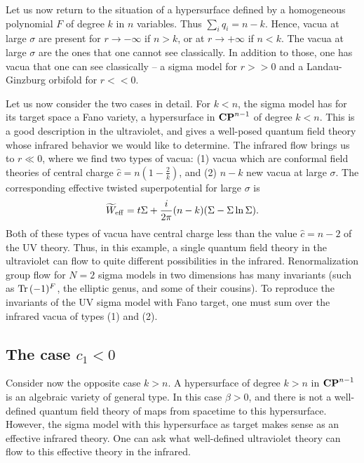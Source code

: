 Let us now return to the situation of a hypersurface defined by a
homogeneous polynomial $F$ of degree $k$ in $n$ variables.
Thus $\sum_iq_i=n-k$.  Hence, vacua at large $\sigma$ are present
for $r\to-\infty$ if $n>k$, or at $r\to +\infty$ if $n<k$.
The vacua at large $\sigma$ are the ones that one cannot see classically.
In addition to those, one has vacua that one can see classically
-- a sigma model for $r>>0$ and a Landau-Ginzburg orbifold for $r<<0$.

\centerline{\quad}
\centerline{\epsfysize=1.35in}
\centerline{\quad}

Let us now consider the two cases in detail.  For $k<n$, the sigma
model has for its target space a Fano variety, a hypersurface in
${\bf CP}^{n-1}$ of degree $k<n$.   This is a good description in the
ultraviolet, and gives a well-posed quantum field theory whose
infrared behavior we would like to determine.
The infrared flow brings us to $r\ll0$, where we find two types of
vacua:
(1) vacua which are conformal field theories of central charge
$\widehat{c}=n(1-\frac2k)$, and
(2) $n-k$ new vacua at large $\sigma$.  The corresponding effective twisted
superpotential for large $\sigma$ is
$$\widetilde{W}_{\rm eff}=t\Sigma + \frac{i}{2\pi}(n-k)(\Sigma -
\Sigma\ln\Sigma).$$
Both of these types of vacua
 have central charge less than the value $\widehat c=n-2$ of
the UV theory.
Thus, in this example, a single quantum field theory in the ultraviolet
can flow to quite different possibilities in the infrared.
Renormalization group flow for $N=2$ sigma models in two dimensions
has many invariants (such as $\mathop{\rm Tr}\nolimits\,(-1)^F$, the elliptic genus, and
some of their cousins).  To reproduce the invariants of the UV sigma
model with Fano target, one must sum over the infrared vacua of types (1)
and (2).

\subsection{The case $c_1<0$}

Consider now the opposite case $k>n$.  A hypersurface of degree $k>n$
in ${\bf CP}^{n-1}$ is an algebraic variety of general type.
 In this case $\beta>0$, and there is
not a well-defined quantum field theory of maps from spacetime to this
hypersurface.  However, the sigma model with this hypersurface as target
makes sense as an effective infrared theory.  One can ask what well-defined
ultraviolet theory can flow to this effective theory in the infrared.

